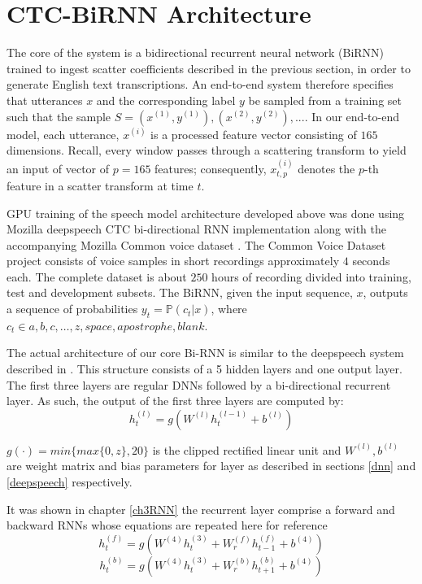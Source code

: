 \section{CTC-BiRNN Architecture}
The core of the system is a bidirectional recurrent neural network (BiRNN) trained to ingest scatter coefficients described in the previous section, in order to generate English text transcriptions.  An end-to-end system therefore specifies that utterances $x$ and the corresponding label $y$ be sampled from a training set such that the sample $S = {(x^{(1)}, y^{(1)}), (x^{(2)}, y^{(2)}), . . .}$.   In our end-to-end model, each utterance, $x^{(i)}$ is a processed feature vector consisting of $165$ dimensions.  Recall, every window passes through a scattering transform to yield an input of vector of $p=165$ features; consequently,   $x^{(i)}_{t,p}$ denotes the $p$-th feature in a scatter transform at time $t$.  

GPU training of the speech model architecture developed above was done using Mozilla deepspeech \cite{mozilla/deepspeech_2019} CTC bi-directional RNN implementation along with the accompanying Mozilla Common voice dataset  \cite{common voice by mozilla_2019}.  The Common Voice Dataset project consists of voice samples in short recordings approximately $4$ seconds each.  The complete dataset is about $250$ hours of recording divided into training, test and development subsets.  The BiRNN, given the input sequence, $x$, outputs a sequence of probabilities $y_t=\mathbb{P}(c_t|x)$,  where $c_t \in a,b,c,\dots,z,space,apostrophe,blank$. 

The actual architecture of our core Bi-RNN is similar to the deepspeech system described in \cite{hannun2014deep}. This structure consists of a 5 hidden layers and one output layer.  The first three layers are regular DNNs followed by a bi-directional recurrent layer. As such, the output of the first three layers are computed by:
\begin{equation}
    h^{(l)}_t = g(W^{(l)} h^{(l−1)}_t + b^{(l)})\label{ch06_01_l1-3}
\end{equation}

$g(\cdot) = min\{max\{0,z\},20\}$  is the clipped rectified linear unit and $W^{(l)},b^{(l)}$ are weight matrix and bias parameters for layer  as described in sections \ref{dnn} and \ref{deepspeech} respectively.

It was shown in chapter \ref{ch3RNN} the recurrent layer comprise a forward and backward RNNs whose equations are repeated here for reference
\begin{equation}
    h^{(f)}_t = g(W^{(4)} h^{(3)}_t + W^{(f)}_r h^{(f)}_{t−1} + b^{(4)})
    \label{ch06_02_fwd}
\end{equation}
\begin{equation}
h^{(b)}_t = g(W^{(4)} h^{(3)}_t + W^{(b)}_r h^{(b)}_{t+1} + b^{(4)})    \label{ch06_03_bwd}
\end{equation}

